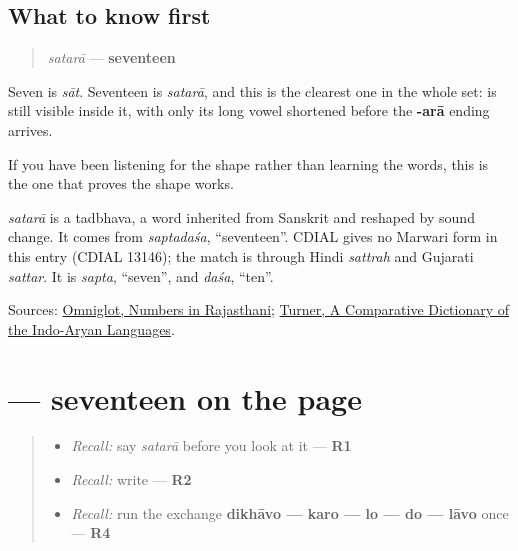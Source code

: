\subsection*{What to know first}
\begin{quote}
\emph{satarā} — \textbf{seventeen}
\end{quote}

Seven is \emph{sāt}. Seventeen is \emph{satarā}, and this is the clearest one in the whole set: \textbf{} is still visible inside it, with only its long vowel shortened before the \textbf{-arā} ending arrives.

If you have been listening for the shape rather than learning the words, this is the one that proves the shape works.

\begin{cousinweb}
\emph{satarā} is a tadbhava, a word inherited from Sanskrit and reshaped by sound change. It comes from \emph{saptadaśa}, \textquotedblleft{}seventeen\textquotedblright{}. CDIAL gives no Marwari form in this entry (CDIAL 13146); the match is through Hindi \emph{sattrah} and Gujarati \emph{sattar}. It is \emph{sapta}, \textquotedblleft{}seven\textquotedblright{}, and \emph{daśa}, \textquotedblleft{}ten\textquotedblright{}.
\end{cousinweb}

\begin{tcolorbox}[breakable,colback=teal!4,colframe=teal!35!black,title={Before you move on}]
Sources: \href{https://www.omniglot.com/language/numbers/rajasthani.htm}{Omniglot, Numbers in Rajasthani}; \href{https://dsal.uchicago.edu/dictionaries/soas/}{Turner, A Comparative Dictionary of the Indo-Aryan Languages}.
\end{tcolorbox}
\section[\texorpdfstring{\mw{सतरा} (satarā)}{सतरा (satarā)}]{ — seventeen on the page}

\label{lesson:MW-C38-satara}



\begin{quote}
\begin{itemize}
\raggedright
  \item \emph{Recall:} say \emph{satarā} before you look at it — \textbf{R1}
  \item \emph{Recall:} write \textbf{} — \textbf{R2}
  \item \emph{Recall:} run the exchange \textbf{dikhāvo — karo — lo — do — lāvo} once — \textbf{R4}
\end{itemize}
\end{quote}

